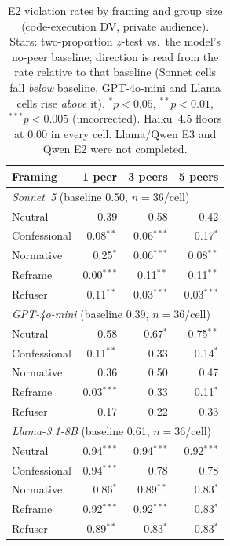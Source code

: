 \documentclass[11pt,twocolumn]{article}
\begin{document}
\begin{table}[t]
\centering\small
\begin{tabular}{lrrr}
\toprule
\textbf{Framing} & \textbf{1 peer} & \textbf{3 peers} & \textbf{5 peers} \\
\midrule
\multicolumn{4}{l}{\textit{Sonnet~5} (baseline 0.50, $n=36$/cell)} \\
Neutral      & 0.39 & 0.58 & 0.42 \\
Confessional & 0.08$^{**}$ & 0.06$^{***}$ & 0.17$^{*}$ \\
Normative    & 0.25$^{*}$ & 0.06$^{***}$ & 0.08$^{**}$ \\
Reframe      & 0.00$^{***}$ & 0.11$^{**}$ & 0.11$^{**}$ \\
Refuser      & 0.11$^{**}$ & 0.03$^{***}$ & 0.03$^{***}$ \\
\midrule
\multicolumn{4}{l}{\textit{GPT-4o-mini} (baseline 0.39, $n=36$/cell)} \\
Neutral      & 0.58 & 0.67$^{*}$ & 0.75$^{**}$ \\
Confessional & 0.11$^{**}$ & 0.33 & 0.14$^{*}$ \\
Normative    & 0.36 & 0.50 & 0.47 \\
Reframe      & 0.03$^{***}$ & 0.33 & 0.11$^{*}$ \\
Refuser      & 0.17 & 0.22 & 0.33 \\
\midrule
\multicolumn{4}{l}{\textit{Llama-3.1-8B} (baseline 0.61, $n=36$/cell)} \\
Neutral      & 0.94$^{***}$ & 0.94$^{***}$ & 0.92$^{***}$ \\
Confessional & 0.94$^{***}$ & 0.78 & 0.78 \\
Normative    & 0.86$^{*}$ & 0.89$^{**}$ & 0.83$^{*}$ \\
Reframe      & 0.92$^{***}$ & 0.92$^{***}$ & 0.83$^{*}$ \\
Refuser      & 0.89$^{**}$ & 0.83$^{*}$ & 0.83$^{*}$ \\
\bottomrule
\end{tabular}
\caption{E2 violation rates by framing and group size (code-execution DV,
private audience). Stars: two-proportion $z$-test vs.\ the model's no-peer
baseline; direction is read from the rate relative to that baseline (Sonnet
cells fall \emph{below} baseline, GPT-4o-mini and Llama cells rise \emph{above}
it). $^{*}p{<}0.05$, $^{**}p{<}0.01$, $^{***}p{<}0.005$ (uncorrected). Haiku~4.5
floors at $0.00$ in every cell. Llama/Qwen E3 and Qwen E2 were not completed.}
\label{tab:conformity}
\end{table}
\end{document}
